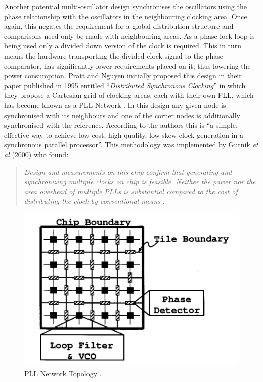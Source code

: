 \documentclass[11pt,english,british]{report}
\begin{document}
Another potential multi-oscillator design synchronises the oscillators using the phase relationship with the oscillators in the neighbouring clocking area. Once again, this negates the requirement for a global distribution structure and comparisons need only be made with neighbouring areas. As a phase lock loop is being used only a divided down version of the clock is required. This in turn means the hardware transporting the divided clock signal to the phase comparator, has significantly lower requirements placed on it, thus lowering the power consumption. Pratt and Nguyen initially proposed this design in their paper published in 1995 entitled ``\textit{Distributed Synchronous Clocking}'' in which they propose a Cartesian grid of clocking areas, each with their own PLL, which has become known as a PLL Network \cite{pratt1995distributed}. In this design any given node is synchronised with its neighbours and one of the corner nodes is additionally synchronised with the reference. According to the authors this is ``a simple, effective way to achieve low cost, high quality, low skew clock generation in a synchronous parallel processor''. This methodology was implemented by Gutnik \textit{et al} (2000) who found:
\begin{quote}
	\singlespacing
	\textit{Design and measurements on this chip confirm that generating and synchronizing multiple clocks on chip is feasible. Neither the power nor the area overhead of multiple PLLs is substantial compared to the cost of distributing the clock by conventional means} \cite{gutnik2000active}.
	\doublespacing
\end{quote}
\begin{figure}[h]
	\centering
	\includegraphics[scale=0.5]{../gutnik2000active}
	\caption{PLL Network Topology \cite{gutnik2000active}.}
	\label{fig:gutnik2000active}
\end{figure}
\end{document}
